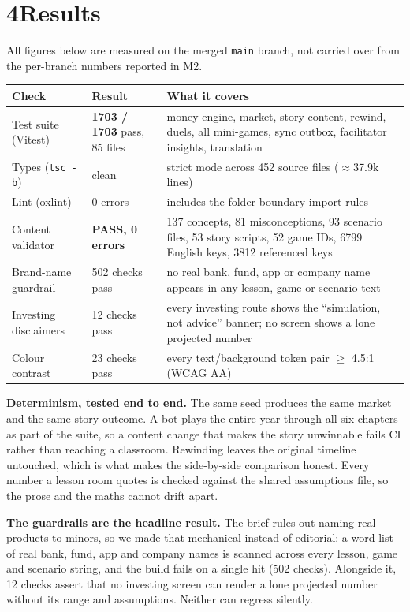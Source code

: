\documentclass[10pt,a4paper]{article}
\begin{document}
\section*{4\quad Results}

All figures below are measured on the merged \texttt{main} branch, not carried over from the per-branch numbers reported in M2.

\begin{center}\small
\begin{tabular}{@{}p{3.9cm}p{2.9cm}p{9.4cm}@{}}
\toprule
\textbf{Check} & \textbf{Result} & \textbf{What it covers}\\
\midrule
Test suite (Vitest) & \textbf{1703 / 1703} pass, 85 files & money engine, market, story content, rewind, duels, all mini-games, sync outbox, facilitator insights, translation\\
Types (\texttt{tsc -b}) & clean & strict mode across 452 source files ($\approx$37.9k lines)\\
Lint (oxlint) & 0 errors & includes the folder-boundary import rules\\
Content validator & \textbf{PASS, 0 errors} & 137 concepts, 81 misconceptions, 93 scenario files, 53 story scripts, 52 game IDs, 6799 English keys, 3812 referenced keys\\
Brand-name guardrail & 502 checks pass & no real bank, fund, app or company name appears in any lesson, game or scenario text\\
Investing disclaimers & 12 checks pass & every investing route shows the ``simulation, not advice'' banner; no screen shows a lone projected number\\
Colour contrast & 23 checks pass & every text/background token pair $\geq$ 4.5:1 (WCAG AA)\\
\bottomrule
\end{tabular}
\end{center}

\textbf{Determinism, tested end to end.} The same seed produces the same market and the same story outcome. A bot plays the entire year through all six chapters as part of the suite, so a content change that makes the story unwinnable fails CI rather than reaching a classroom. Rewinding leaves the original timeline untouched, which is what makes the side-by-side comparison honest. Every number a lesson room quotes is checked against the shared assumptions file, so the prose and the maths cannot drift apart.

\textbf{The guardrails are the headline result.} The brief rules out naming real products to minors, so we made that mechanical instead of editorial: a word list of real bank, fund, app and company names is scanned across every lesson, game and scenario string, and the build fails on a single hit (502 checks). Alongside it, 12 checks assert that no investing screen can render a lone projected number without its range and assumptions. Neither can regress silently.
\end{document}
